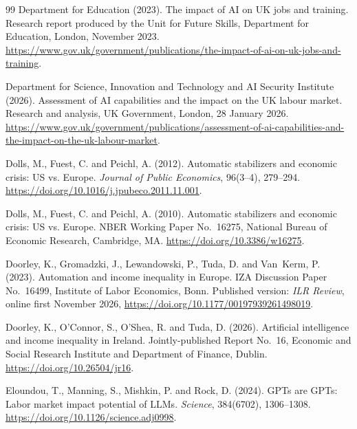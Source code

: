 \begin{thebibliography}{99}
Department for Education (2023).
\newblock The impact of AI on UK jobs and training.
\newblock Research report produced by the Unit for Future Skills, Department for Education, London, November 2023.
\newblock \url{https://www.gov.uk/government/publications/the-impact-of-ai-on-uk-jobs-and-training}.

Department for Science, Innovation and Technology and AI Security Institute (2026).
\newblock Assessment of AI capabilities and the impact on the UK labour market.
\newblock Research and analysis, UK Government, London, 28 January 2026.
\newblock \url{https://www.gov.uk/government/publications/assessment-of-ai-capabilities-and-the-impact-on-the-uk-labour-market}.

Dolls, M., Fuest, C. and Peichl, A. (2012).
\newblock Automatic stabilizers and economic crisis: US vs. Europe.
\newblock \emph{Journal of Public Economics}, 96(3--4), 279--294.
\newblock \url{https://doi.org/10.1016/j.jpubeco.2011.11.001}.

Dolls, M., Fuest, C. and Peichl, A. (2010).
\newblock Automatic stabilizers and economic crisis: US vs. Europe.
\newblock NBER Working Paper No.~16275, National Bureau of Economic Research, Cambridge, MA.
\newblock \url{https://doi.org/10.3386/w16275}.

Doorley, K., Gromadzki, J., Lewandowski, P., Tuda, D. and Van~Kerm, P. (2023).
\newblock Automation and income inequality in Europe.
\newblock IZA Discussion Paper No.~16499, Institute of Labor Economics, Bonn. Published version: \emph{ILR Review}, online first November 2026, \url{https://doi.org/10.1177/00197939261498019}.

Doorley, K., O'Connor, S., O'Shea, R. and Tuda, D. (2026).
\newblock Artificial intelligence and income inequality in Ireland.
\newblock Jointly-published Report No.~16, Economic and Social Research Institute and Department of Finance, Dublin.
\newblock \url{https://doi.org/10.26504/jr16}.

Eloundou, T., Manning, S., Mishkin, P. and Rock, D. (2024).
\newblock GPTs are GPTs: Labor market impact potential of LLMs.
\newblock \emph{Science}, 384(6702), 1306--1308.
\newblock \url{https://doi.org/10.1126/science.adj0998}.


\end{thebibliography}
